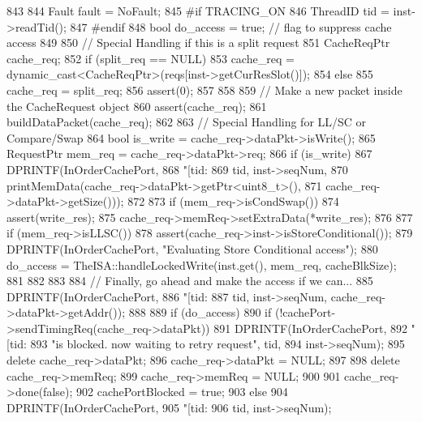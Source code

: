 \begin{DoxyCode}
843 {
844     Fault fault = NoFault;
845 #if TRACING_ON
846     ThreadID tid = inst->readTid();
847 #endif
848     bool do_access = true;  // flag to suppress cache access
849 
850     // Special Handling if this is a split request
851     CacheReqPtr cache_req;
852     if (split_req == NULL)
853         cache_req = dynamic_cast<CacheReqPtr>(reqs[inst->getCurResSlot()]);
854     else {
855         cache_req = split_req;
856         assert(0);
857     }
858 
859     // Make a new packet inside the CacheRequest object
860     assert(cache_req);
861     buildDataPacket(cache_req);
862 
863     // Special Handling for LL/SC or Compare/Swap
864      bool is_write = cache_req->dataPkt->isWrite();
865      RequestPtr mem_req = cache_req->dataPkt->req;
866      if (is_write) {
867          DPRINTF(InOrderCachePort,
868                  "[tid:%
869                  tid, inst->seqNum,
870                  printMemData(cache_req->dataPkt->getPtr<uint8_t>(),
871                               cache_req->dataPkt->getSize()));
872 
873         if (mem_req->isCondSwap()) {
874              assert(write_res);
875              cache_req->memReq->setExtraData(*write_res);
876          }
877         if (mem_req->isLLSC()) {
878             assert(cache_req->inst->isStoreConditional());
879             DPRINTF(InOrderCachePort, "Evaluating Store Conditional access\n");
880             do_access = TheISA::handleLockedWrite(inst.get(), mem_req, 
      cacheBlkSize);
881         }
882      }
883 
884     // Finally, go ahead and make the access if we can...
885     DPRINTF(InOrderCachePort,
886             "[tid:%
887             tid, inst->seqNum, cache_req->dataPkt->getAddr());
888 
889     if (do_access) {
890         if (!cachePort->sendTimingReq(cache_req->dataPkt)) {
891             DPRINTF(InOrderCachePort,
892                     "[tid:%
893                     "is blocked. now waiting to retry request\n", tid, 
894                     inst->seqNum);
895             delete cache_req->dataPkt;
896             cache_req->dataPkt = NULL;
897 
898             delete cache_req->memReq;
899             cache_req->memReq = NULL;
900 
901             cache_req->done(false);
902             cachePortBlocked = true;
903         } else {
904             DPRINTF(InOrderCachePort,
905                     "[tid:%
906                     tid, inst->seqNum);
}}}
\end{DoxyCode}
